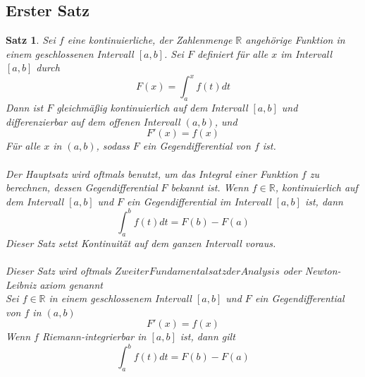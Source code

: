 \documentclass[fontsize=12pt,paper=a4,DIV12,cleardoublepage=empty, 
liststotoc,idxtotoc,bibtotoc]{article}
\newcommand{\RR}{\mathbb{R}}
\theoremstyle{plain}
\newtheorem{satz}{Satz}[subsection]
\theoremstyle{definition}
\begin{document}
	\subsection{Erster Satz}
	\begin{satz}
		Sei $f$ eine kontinuierliche, der Zahlenmenge $\RR$ angehörige Funktion in einem geschlossenen Intervall $[a, b]$. Sei $F$ definiert für alle $x$ im Intervall $[a, b]$ durch \\
			\begin{equation}
				F(x)=\int_{a}^{x}f(t) dt
			\end{equation}
		Dann ist $F$ gleichmäßig kontinuierlich auf dem Intervall $[a, b]$ und differenzierbar auf dem offenen Intervall $(a, b)$, und 
			\begin{equation}
				F'(x)=f(x)
			\end{equation}
		Für alle $x$ in $(a, b)$, sodass $F$ ein Gegendifferential von $f$ ist.\\\\

		Der Hauptsatz wird oftmals benutzt, um das Integral einer Funktion $f$ zu berechnen, dessen Gegendifferential $F$ bekannt ist. Wenn $f \in \RR$, kontinuierlich auf dem Intervall $[a, b]$ und $F$ ein Gegendifferential im Intervall $[a, b]$ ist, dann
		\begin{equation}
			\int_{a}^{b}f(t) dt=F(b)-F(a)
		\end{equation}
		Dieser Satz setzt Kontinuität auf dem ganzen Intervall voraus.\\\\
	
	Dieser Satz wird oftmals $Zweiter Fundamentalsatz der Analysis$ oder Newton-Leibniz axiom genannt\\
	Sei $f \in \RR$ in einem geschlossenem Intervall $[a, b]$ und $F$ ein Gegendifferential von $f$ in $(a, b)$
	\begin{equation}
		F'(x)=f(x)
	\end{equation}
	Wenn $f$ Riemann-integrierbar in $[a, b]$ ist, dann gilt
	\begin{equation}
		\int_{a}^{b}f(t) dt = F(b)-F(a)
	\end{equation}
	
	\end{satz}
	
\end{document}
